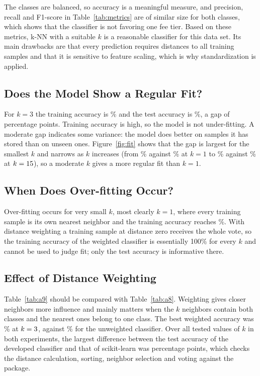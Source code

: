 \documentclass[conference]{IEEEtran}
\begin{document}
The classes are balanced, so accuracy is a meaningful measure, and precision, recall and F1-score in Table~\ref{tab:metrics} are of similar size for both classes, which shows that the classifier is not favoring one fee tier. Based on these metrics, k-NN with a suitable $k$ is a reasonable classifier for this data set. Its main drawbacks are that every prediction requires distances to all training samples and that it is sensitive to feature scaling, which is why standardization is applied.

\subsection{Does the Model Show a Regular Fit?}

For $k=3$ the training accuracy is \trainAccThree\% and the test accuracy is \testAccThree\%, a gap of \gapAccThree{} percentage points. Training accuracy is high, so the model is not under-fitting. A moderate gap indicates some variance: the model does better on samples it has stored than on unseen ones. Figure~\ref{fig:fit} shows that the gap is largest for the smallest $k$ and narrows as $k$ increases (from \trainAccOne\% against \testAccOne\% at $k=1$ to \trainAccLast\% against \testAccLast\% at $k=15$), so a moderate $k$ gives a more regular fit than $k=1$.

\subsection{When Does Over-fitting Occur?}

Over-fitting occurs for very small $k$, most clearly $k=1$, where every training sample is its own nearest neighbor and the training accuracy reaches \trainAccOne\%. With distance weighting a training sample at distance zero receives the whole vote, so the training accuracy of the weighted classifier is essentially 100\% for every $k$ and cannot be used to judge fit; only the test accuracy is informative there.

\subsection{Effect of Distance Weighting}

Table~\ref{tab:a9} should be compared with Table~\ref{tab:a8}. Weighting gives closer neighbors more influence and mainly matters when the $k$ neighbors contain both classes and the nearest ones belong to one class. The best weighted accuracy was \bestAccWeighted\% at $k=3$, against \bestAccNormal\% for the unweighted classifier. Over all tested values of $k$ in both experiments, the largest difference between the test accuracy of the developed classifier and that of scikit-learn was \maxDiffAll{} percentage points, which checks the distance calculation, sorting, neighbor selection and voting against the package.
\end{document}
